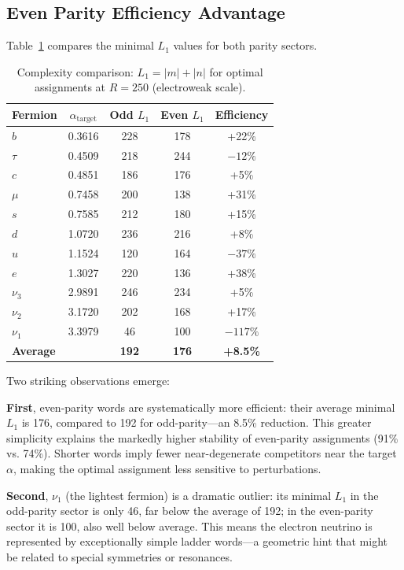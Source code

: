 \documentclass[11pt,a4paper]{article}
\begin{document}
\subsection{Even Parity Efficiency Advantage}

Table~\ref{tab:complexity} compares the minimal $L_1$ values for both parity sectors.

\begin{table}[h]
\centering
\caption{Complexity comparison: $L_1 = |m| + |n|$ for optimal assignments at $R=250$ (electroweak scale).}
\label{tab:complexity}
\small
\begin{tabular}{lcccc}
\toprule
Fermion & $\alpha_{\text{target}}$ & Odd $L_1$ & Even $L_1$ & Efficiency \\
\midrule
$b$ & 0.3616 & 228 & 178 & +22\% \\
$\tau$ & 0.4509 & 218 & 244 & $-12\%$ \\
$c$ & 0.4851 & 186 & 176 & +5\% \\
$\mu$ & 0.7458 & 200 & 138 & +31\% \\
$s$ & 0.7585 & 212 & 180 & +15\% \\
$d$ & 1.0720 & 236 & 216 & +8\% \\
$u$ & 1.1524 & 120 & 164 & $-37\%$ \\
$e$ & 1.3027 & 220 & 136 & +38\% \\
$\nu_3$ & 2.9891 & 246 & 234 & +5\% \\
$\nu_2$ & 3.1720 & 202 & 168 & +17\% \\
$\nu_1$ & 3.3979 & 46 & 100 & $-117\%$ \\
\midrule
\textbf{Average} & & \textbf{192} & \textbf{176} & \textbf{+8.5\%} \\
\bottomrule
\end{tabular}
\end{table}

Two striking observations emerge:

\textbf{First}, even-parity words are systematically more efficient: their average minimal $L_1$ is 176, compared to 192 for odd-parity—an 8.5\% reduction. This greater simplicity explains the markedly higher stability of even-parity assignments (91\% vs. 74\%). Shorter words imply fewer near-degenerate competitors near the target $\alpha$, making the optimal assignment less sensitive to perturbations.

\textbf{Second}, $\nu_1$ (the lightest fermion) is a dramatic outlier: its minimal $L_1$ in the odd-parity sector is only 46, far below the average of 192; in the even-parity sector it is 100, also well below average. This means the electron neutrino is represented by exceptionally simple ladder words—a geometric hint that might be related to special symmetries or resonances.
\end{document}
